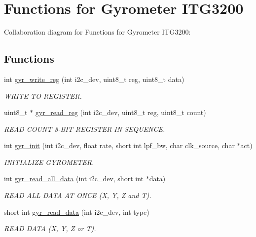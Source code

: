 \hypertarget{group__gyr}{
\section{Functions for Gyrometer ITG3200}
\label{group__gyr}
}


Collaboration diagram for Functions for Gyrometer ITG3200:

\subsection*{Functions}
\begin{DoxyCompactItemize}
\item 
int \hyperlink{group__gyr_ga3eba167b8ab0614bfe7bafeae8b5570d}{gyr\_\-write\_\-reg} (int i2c\_\-dev, uint8\_\-t reg, uint8\_\-t data)
\begin{DoxyCompactList}\small\item\em WRITE TO REGISTER. \item\end{DoxyCompactList}\item 
uint8\_\-t $\ast$ \hyperlink{group__gyr_gad817a3b69d4c3026b7a9b6de32753e7b}{gyr\_\-read\_\-reg} (int i2c\_\-dev, uint8\_\-t reg, uint8\_\-t count)
\begin{DoxyCompactList}\small\item\em READ COUNT 8-\/BIT REGISTER IN SEQUENCE. \item\end{DoxyCompactList}\item 
int \hyperlink{group__gyr_ga6d02be352b4491a236c9695a6a24d174}{gyr\_\-init} (int i2c\_\-dev, float rate, short int lpf\_\-bw, char clk\_\-source, char $\ast$act)
\begin{DoxyCompactList}\small\item\em INITIALIZE GYROMETER. \item\end{DoxyCompactList}\item 
int \hyperlink{group__gyr_ga79875465c3a29fd9ec77308c80a8bc37}{gyr\_\-read\_\-all\_\-data} (int i2c\_\-dev, short int $\ast$data)
\begin{DoxyCompactList}\small\item\em READ ALL DATA AT ONCE (X, Y, Z and T). \item\end{DoxyCompactList}\item 
short int \hyperlink{group__gyr_ga271b37e9ace81b18bb2f83787247d262}{gyr\_\-read\_\-data} (int i2c\_\-dev, int type)
\begin{DoxyCompactList}\small\item\em READ DATA (X, Y, Z or T). \item\end{DoxyCompactList}\end{DoxyCompactItemize}


